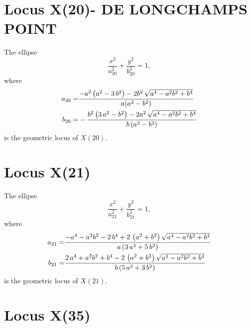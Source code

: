 \documentclass[11pt]{amsart}
\theoremstyle{plain}
\theoremstyle{definition}
\begin{document}
%
%
%

     \section{Locus X(20)- DE LONGCHAMPS POINT }

The ellipse \[ \frac{x^2}{a_{20}^2}+\frac{y^2}{b_{20}^2}=1, \]
where
\[\aligned 
a_{20}=&     {\frac {-{a}^{2} \left( {a}^{2}-3\,{b}^{2} \right) -2b^2\,\sqrt {{a}^{4}-
			{a}^{2}{b}^{2}+{b}^{4}} }{a(  {a}^{2}- {b}^{2})}}
%
\\
b_{20}=&  -{\frac {{b}^{2} \left( 3\,{a}^{2}-{b}^{2} \right) -2a^2\,\sqrt {{a}^{4}-
			{a}^{2}{b}^{2}+{b}^{4}} }{b \left( {a}^{2}-{b}^{2} \right) }}
%
%
\endaligned\] 
is the geometric locus of $X(20)$.

     \section{Locus X(21)}

The ellipse \[ \frac{x^2}{a_{21}^2}+\frac{y^2}{b_{21}^2}=1, \]
where
\[\aligned 
a_{21}=&     {\frac {-{a}^{4}-{a}^{2}{b}^{2}-2\,{b}^{4}+2\, \left( {a}^{2}+{b}^{2}
		\right) \sqrt {{a}^{4}-{a}^{2}{b}^{2}+{b}^{4}}}{a \left( 3\,{a}^{2}+5
		\,{b}^{2} \right) }}
%
\\
b_{21}=&  {\frac {2\,{a}^{4}+{a}^{2}{b}^{2}+{b}^{4}-2\, \left( {a}^{2}+{b}^{2}
		\right) \sqrt {{a}^{4}-{a}^{2}{b}^{2}+{b}^{4}}}{b \left( 5\,{a}^{2}+3
		\,{b}^{2} \right) }}
%
%
\endaligned\] 
is the geometric locus of $X(21)$.



     \section{Locus X(35)}
\end{document}
